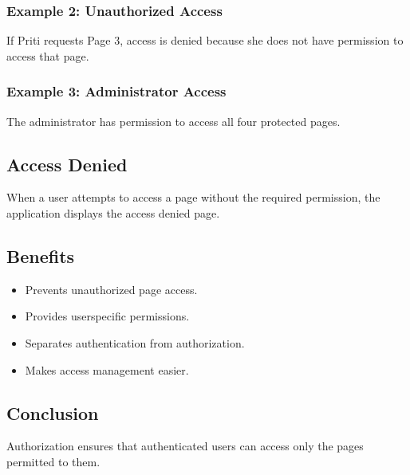 \documentclass[letterpaper,10pt,english]{sphinxmanual}
\begin{document}
\subsubsection{Example 2: Unauthorized Access}
\label{\detokenize{authorization:example-2-unauthorized-access}}
\sphinxAtStartPar
If Priti requests Page 3, access is denied because she does not have
permission to access that page.


\subsubsection{Example 3: Administrator Access}
\label{\detokenize{authorization:example-3-administrator-access}}
\sphinxAtStartPar
The administrator has permission to access all four protected pages.


\subsection{Access Denied}
\label{\detokenize{authorization:access-denied}}
\sphinxAtStartPar
When a user attempts to access a page without the required permission,
the application displays the access denied page.


\subsection{Benefits}
\label{\detokenize{authorization:benefits}}\begin{itemize}
\item {} 
\sphinxAtStartPar
Prevents unauthorized page access.

\item {} 
\sphinxAtStartPar
Provides user\sphinxhyphen{}specific permissions.

\item {} 
\sphinxAtStartPar
Separates authentication from authorization.

\item {} 
\sphinxAtStartPar
Makes access management easier.

\end{itemize}


\subsection{Conclusion}
\label{\detokenize{authorization:conclusion}}
\sphinxAtStartPar
Authorization ensures that authenticated users can access only the pages
permitted to them.
\end{document}
